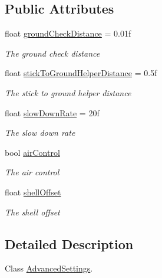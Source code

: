 \subsection*{Public Attributes}
\begin{DoxyCompactItemize}
\item 
float \hyperlink{class_lerp2_assets_1_1_characters_1_1_first_person_1_1_rigidbody_first_person_controller_1_1_advanced_settings_a7bd514b59c43a151d1602cb8089dd14b}{ground\+Check\+Distance} = 0.\+01f
\begin{DoxyCompactList}\small\item\em The ground check distance \end{DoxyCompactList}\item 
float \hyperlink{class_lerp2_assets_1_1_characters_1_1_first_person_1_1_rigidbody_first_person_controller_1_1_advanced_settings_a92f00accf262999ed7e6b91886025ff9}{stick\+To\+Ground\+Helper\+Distance} = 0.\+5f
\begin{DoxyCompactList}\small\item\em The stick to ground helper distance \end{DoxyCompactList}\item 
float \hyperlink{class_lerp2_assets_1_1_characters_1_1_first_person_1_1_rigidbody_first_person_controller_1_1_advanced_settings_a3cf69ae03fc31b9fd318c59de5f4a680}{slow\+Down\+Rate} = 20f
\begin{DoxyCompactList}\small\item\em The slow down rate \end{DoxyCompactList}\item 
bool \hyperlink{class_lerp2_assets_1_1_characters_1_1_first_person_1_1_rigidbody_first_person_controller_1_1_advanced_settings_aefac7e62b261119a4530f2c56b519ede}{air\+Control}
\begin{DoxyCompactList}\small\item\em The air control \end{DoxyCompactList}\item 
float \hyperlink{class_lerp2_assets_1_1_characters_1_1_first_person_1_1_rigidbody_first_person_controller_1_1_advanced_settings_ac895a40b8cc342ed532f95d45d5fed84}{shell\+Offset}
\begin{DoxyCompactList}\small\item\em The shell offset \end{DoxyCompactList}\end{DoxyCompactItemize}


\subsection{Detailed Description}
Class \hyperlink{class_lerp2_assets_1_1_characters_1_1_first_person_1_1_rigidbody_first_person_controller_1_1_advanced_settings}{Advanced\+Settings}. 



